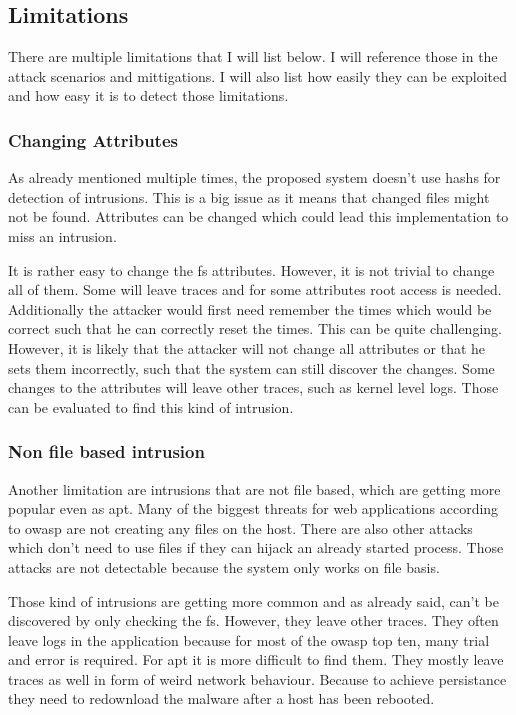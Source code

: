 \documentclass[
	a4paper,					%
	10pt,							%
	twoside,					%
	openright,				%
	notitlepage,			%
	parskip=half,			%
]{scrreprt}					%
\begin{document}
\subsection{Limitations}
\label{sec:Limitations}

There are multiple limitations that I will list below. I will reference those in the attack scenarios and mittigations. I will also list how easily they can be exploited and how easy it is to detect those limitations.

\subsubsection{Changing Attributes}
\label{sec:limitation:chattr}
As already mentioned multiple times, the proposed system doesn't use \glspl{hash} for detection of intrusions. This is a big issue as it means that changed files might not be found. Attributes can be changed which could lead this implementation to miss an intrusion.  \cite{chaning:times, changing:attributes}

It is rather easy to change the \gls{fs} attributes. However, it is not trivial to change all of them. Some will leave traces and for some attributes root access is needed. Additionally the attacker would first need remember the times which would be correct such that he can correctly reset the times. This can be quite challenging. However, it is likely that the attacker will not change all attributes or that he sets them incorrectly, such that the system can still discover the changes. Some changes to the attributes will leave other traces, such as kernel level logs. Those can be evaluated to find this kind of intrusion.

\subsubsection{Non file based intrusion}
\label{sec:limitation:nonFileBased}
Another limitation are intrusions that are not file based, which are getting more popular even as \gls{apt}. Many of the biggest threats for web applications according to \gls{owasp} are not creating any files on the host. \cite{owasp} There are also other attacks which don't need to use files if they can hijack an already started process. Those attacks are not detectable because the system only works on file basis.

Those kind of intrusions are getting more common and as already said, can't be discovered by only checking the \gls{fs}. However, they leave other traces. They often leave logs in the application because for most of the \gls{owasp} top ten, many trial and error is required. For \gls{apt} it is more difficult to find them. They mostly leave traces as well in form of weird network behaviour. Because to achieve persistance they need to redownload the malware after a host has been rebooted.
\end{document}
